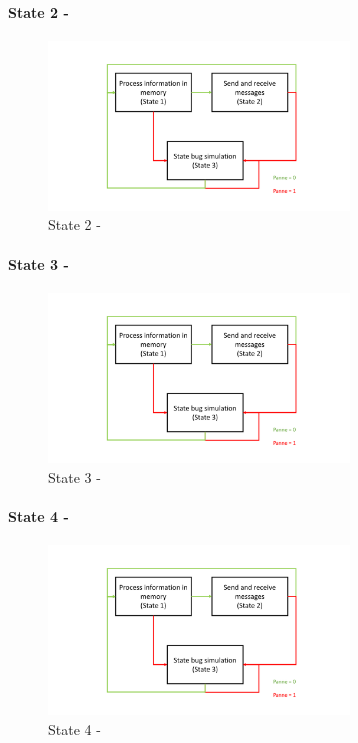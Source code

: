 \paragraph{State 2 - }
\begin{figure}[h!]
    \centering
    \includegraphics[page=4,clip,width = 8cm]{systeme_multi_agent/realisation/multi_agent_implemented_schematic.pdf}
    \caption{State 2 - }
    \label{fig:State2-process_information_in_memory}
\end{figure}

\paragraph{State 3 - }
\begin{figure}[h!]
    \centering
    \includegraphics[page=5,clip,width = 8cm]{systeme_multi_agent/realisation/multi_agent_implemented_schematic.pdf}
    \caption{State 3 - }
    \label{fig:State3-Communication}
\end{figure}

\paragraph{State 4 - }
\begin{figure}[h!]
    \centering
    \includegraphics[page=6,clip,width = 8cm]{systeme_multi_agent/realisation/multi_agent_implemented_schematic.pdf}
    \caption{State 4 - }
    \label{fig:State4-motion}
\end{figure}